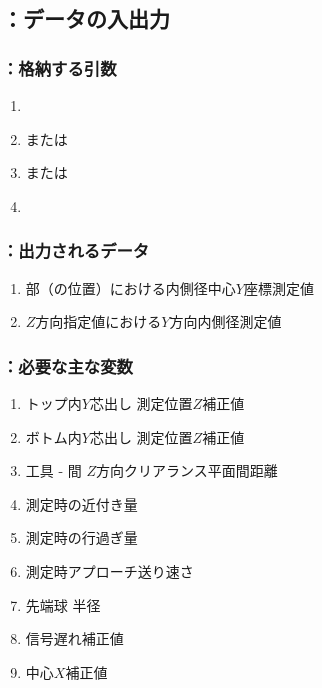 \subsection{\MYIWidth：データの入出力}

\subsubsection{\MYIWidth：格納する引数}
\begin{enumerate}[label*=\sarrow]
\item \PMBDOD
\item \PMTopEndBDID または\PMBottomEndBDID
\item \PMTopReAlocationLength または\PMBottomReAlocationLength
\item \PMPlatingThk
\end{enumerate}

\subsubsection{\MYIWidth：出力されるデータ}
\begin{enumerate}[label*=\sarrow]
\item \EndFace 部（\ReAlocationLength の位置）における内側径中心$Y$座標測定値
\item $Z$方向指定値における$Y$方向内側径測定値
\end{enumerate}

\subsubsection{\MYIWidth：必要な主な変数}
\begin{enumerate}[label*=\sarrow]
\item トップ内$Y$芯出し 測定位置$Z$補正値
\item ボトム内$Y$芯出し 測定位置$Z$補正値
\item 工具 - \EndFace 間 $Z$方向クリアランス平面間距離
\item \TouchSensorProbe 測定時の近付き量
\item \TouchSensorProbe 測定時の行過ぎ量
\item \TouchSensorProbe 測定時アプローチ送り速さ
\item \TouchSensorProbe 先端球 半径
\item \TouchSensorProbe 信号遅れ補正値
\item \TouchSensorProbe 中心$X$補正値
\end{enumerate}


